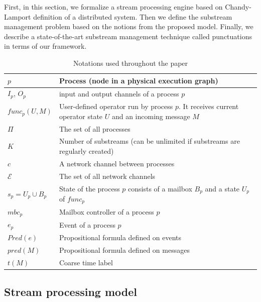 \label{fs-acker-preliminaries}

First, in this section, we formalize a stream processing engine based on Chandy-Lamport definition of a distributed system. Then we define the substream management problem based on the notions from the proposed model. Finally, we describe a state-of-the-art substream management technique called punctuations in terms of our framework.

\begin{table}[!b]
    \caption{Notations used throughout the paper}
    \footnotesize
    \begin{tabular}{l|p{5cm}}
        \hline
        $p$ & Process (node in a physical execution graph) \\ 
        \hline
        $I_p$, $O_p$ & input and output channels of a process $p$ \\ 
        \hline
        $func_p(U, M)$ & User-defined operator run by process $p$. It receives current operator state $U$ and an incoming message $M$ \\ 
        \hline
        $\Pi$ & The set of all processes  \\
        \hline
        $K$ & Number of substreams (can be unlimited if substreams are regularly created) \\
        \hline
        $c$ & A network channel between processes  \\
        \hline
        $\mathcal{E}$ & The set of all network channels  \\
        \hline
        $s_p = U_p \cup B_p$ & State of the process $p$ consists of a mailbox $B_p$ and a state $U_p$ of $func_p$ \\
        \hline
        $mbc_{p}$ & Mailbox controller of a process $p$ \\
        \hline
        $e_{p}$ & Event of a process $p$ \\
        \hline
        $Pred(e)$ & Propositional formula defined on events \\
        \hline
        $pred(M)$ & Propositional formula defined on messages\\
        \hline
        $t(M)$ & Coarse time label \\
    \end{tabular}
    \label{notations}
\end{table}

\subsection{Stream processing model}
\label{fs-acker-processing-model}

